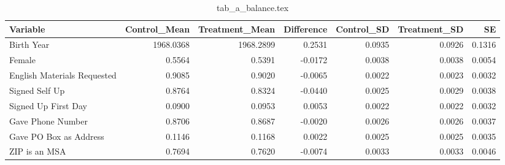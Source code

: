 \begin{table}[!h]
\centering
\caption{tab_a_balance.tex}
\centering
\begin{tabular}[t]{lrrrrrr}
\toprule
Variable & Control\_Mean & Treatment\_Mean & Difference & Control\_SD & Treatment\_SD & SE\\
\midrule
Birth Year & 1968.0368 & 1968.2899 & 0.2531 & 0.0935 & 0.0926 & 0.1316\\
Female & 0.5564 & 0.5391 & -0.0172 & 0.0038 & 0.0038 & 0.0054\\
English Materials Requested & 0.9085 & 0.9020 & -0.0065 & 0.0022 & 0.0023 & 0.0032\\
Signed Self Up & 0.8764 & 0.8324 & -0.0440 & 0.0025 & 0.0029 & 0.0038\\
Signed Up First Day & 0.0900 & 0.0953 & 0.0053 & 0.0022 & 0.0022 & 0.0032\\
\addlinespace
Gave Phone Number & 0.8706 & 0.8687 & -0.0020 & 0.0026 & 0.0026 & 0.0037\\
Gave PO Box as Address & 0.1146 & 0.1168 & 0.0022 & 0.0025 & 0.0025 & 0.0035\\
ZIP is an MSA & 0.7694 & 0.7620 & -0.0074 & 0.0033 & 0.0033 & 0.0046\\
\bottomrule
\end{tabular}
\end{table}
